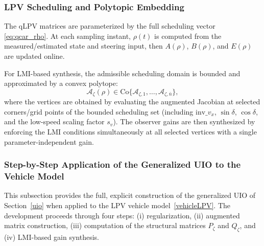 
\subsubsection{LPV Scheduling and Polytopic Embedding}\label{sec6_polytopic}
The qLPV matrices are parameterized by the full scheduling vector \eqref{eq:qcar_rho}. At each sampling instant, $\rho(t)$ is computed from the measured/estimated state and steering input, then $A(\rho)$, $B(\rho)$, and $E(\rho)$ are updated online.

For LMI-based synthesis, the admissible scheduling domain is bounded and approximated by a convex polytope:
\[
\mathcal{A}_{\zeta}(\rho)\in \mathrm{Co}\{\mathcal{A}_{\zeta,1},\dots,\mathcal{A}_{\zeta,\bar n}\},
\]
where the vertices are obtained by evaluating the augmented Jacobian at selected corners/grid points of the bounded scheduling set (including $\mathrm{inv}\_v_x$, $\sin\delta$, $\cos\delta$, and the low-speed scaling factor $s_v$). The observer gains are then synthesized by enforcing the LMI conditions simultaneously at all selected vertices with a single parameter-independent gain.

\subsubsection{Step-by-Step Application of the Generalized UIO to the Vehicle Model}\label{sec6_uio_vehicle}

This subsection provides the full, explicit construction of the generalized UIO of Section~\ref{uio} when applied to the LPV vehicle model~\eqref{vehicleLPV}. The development proceeds through four steps: (i) regularization, (ii) augmented matrix construction, (iii) computation of the structural matrices $P_{\zeta}$ and $Q_{\zeta}$, and (iv) LMI-based gain synthesis.

